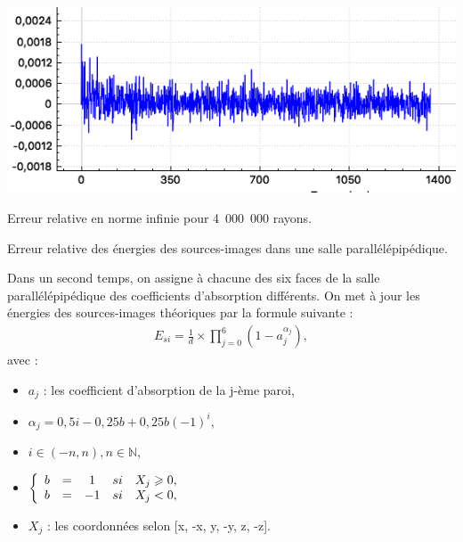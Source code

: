 \begin{figureth}
\begin{subfigureth}{0.8\textwidth}
		\includegraphics[width=\linewidth]{images/test3_4}
		\caption{Erreur relative en norme infinie pour 4~000~000 rayons.}
		\label{test3_4}
	\end{subfigureth}
	\caption{Erreur relative des énergies des sources-images dans une salle parallélépipédique.}
\end{figureth}
		
Dans un second temps, on assigne à chacune des six faces de la salle parallélépipédique des coefficients d'absorption différents. On met à jour les énergies des sources-images théoriques par la formule suivante :
\begin{align}
E_{si} = \frac{1}{d} \times \prod_{j=0}^{6}{(1-a_j^{\alpha_j})}, 
\end{align}
avec : 
\begin{itemize}
\item $a_j$ : les coefficient d'absorption de la j-ème paroi,
\item $\alpha_j  = 0,5i - 0,25b + 0,25b(-1)^i$,
\item $ i \in (-n, n), n \in \mathbb{N}$,
\item  $
 \left \{
   \begin{array}{r c c c l}
       b & = & 1 & si & X_j \geqslant 0, \\
       b & = & -1 & si & X_j < 0,
   \end{array}
   \right.$
\item $X_j$ : les coordonnées selon [x, -x, y, -y, z, -z].
\end{itemize}

